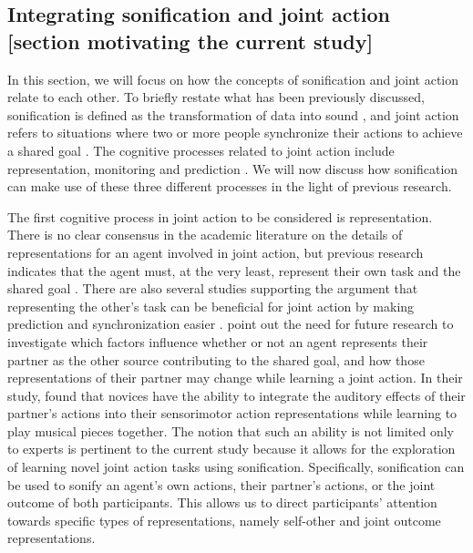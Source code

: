 \documentclass[10pt,a4paper,onecolumn]{article}
\begin{document}
\hypertarget{integrating-sonification-and-joint-action-section-motivating-the-current-study}{%
\subsection{Integrating sonification and joint action {[}section motivating the current study{]}}\label{integrating-sonification-and-joint-action-section-motivating-the-current-study}}

In this section, we will focus on how the concepts of sonification and joint action relate to each other. To briefly restate what has been previously discussed, sonification is defined as the transformation of data into sound \autocite{kramerSonificationReportStatus1999}, and joint action refers to situations where two or more people synchronize their actions to achieve a shared goal \autocite{knoblichPsychologicalResearchJoint2011}. The cognitive processes related to joint action include representation, monitoring and prediction \autocite{loehrMonitoringIndividualJoint2013,sebanzJointActionBodies2006,vesperMinimalArchitectureJoint2010}. We will now discuss how sonification can make use of these three different processes in the light of previous research.

The first cognitive process in joint action to be considered is representation. There is no clear consensus in the academic literature on the details of representations for an agent involved in joint action, but previous research indicates that the agent must, at the very least, represent their own task and the shared goal \autocite{vesperMinimalArchitectureJoint2010}. There are also several studies supporting the argument that representing the other's task can be beneficial for joint action by making prediction and synchronization easier \autocite{boltSensoryAttenuationAuditory2021,kellerPianistsDuetBetter2007,kourtisPredictiveRepresentationOther2012,sebanzJointActionBodies2006,wenkeWhatSharedJoint2011}. \textcite{loehrSoundYouMe2016} point out the need for future research to investigate which factors influence whether or not an agent represents their partner as the other source contributing to the shared goal, and how those representations of their partner may change while learning a joint action. In their study, \textcite{loehrSoundYouMe2016} found that novices have the ability to integrate the auditory effects of their partner's actions into their sensorimotor action representations while learning to play musical pieces together. The notion that such an ability is not limited only to experts is pertinent to the current study because it allows for the exploration of learning novel joint action tasks using sonification. Specifically, sonification can be used to sonify an agent's own actions, their partner's actions, or the joint outcome of both participants. This allows us to direct participants' attention towards specific types of representations, namely self-other and joint outcome representations.
\end{document}
